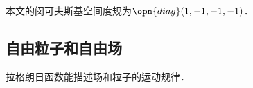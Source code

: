 

本文的闵可夫斯基空间度规为$\opn{diag}(1, -1, -1, -1)$．

\subsection{自由粒子和自由场}

拉格朗日函数能描述场和粒子的运动规律．



















